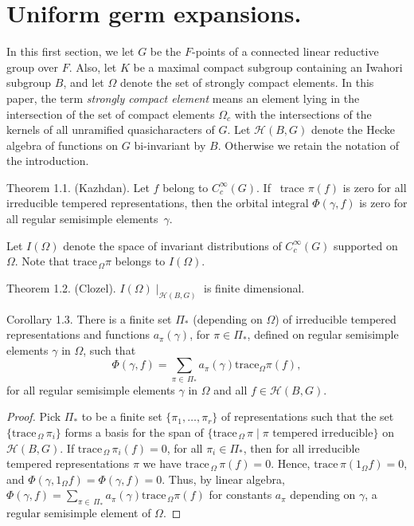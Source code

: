 \documentclass{amsart}
\begin{document}
\section{{{Uniform germ expansions.}}}


\medskip
\noindent
In this first section, we let $G$ be the $F$-points of a 
  connected linear reductive group over $F$. Also, let $K$ 
  be a maximal
  compact subgroup containing an Iwahori subgroup $B$, and
let
   $ \Omega $
denote the set of strongly compact elements.  In this paper, the term
{\it strongly compact element} means an element lying in the
intersection of the set of compact elements $\Omega_c$ with
the intersections of the kernels of all unramified quasicharacters of $G$.
Let 
  $ {\mathcal H} (B,G) $
denote the Hecke algebra of functions on $G$ bi-invariant
  by $B$.
Otherwise we retain the notation of the introduction.

\proclaim Theorem {1.1.} {\rm (Kazhdan)}.
Let
  $ f$ belong to $C_c^{\infty} (G) $.
If \, {\rm trace}
  $ \pi (f)$ is zero 
for all irreducible tempered representations, then the orbital integral
  $ \Phi (\gamma,f) $ is zero
for all regular semisimple elements~$ \gamma $.
\finishproclaim

Let
  $ I (\Omega) $
denote the space of invariant distributions of
  $ C_c^{\infty} (G) $
supported on $\Omega$.
Note that 
  $ \text{trace}_{\,\Omega} \pi $ belongs to $I(\Omega) $.

\proclaim Theorem {1.2.} {\rm (Clozel)}.
  $ I (\Omega) \mid_{{\mathcal H}(B,G)} $
is finite dimensional.
\finishproclaim

\proclaim Corollary {1.3}.
There is a finite set
  $ \Pi_* $ (depending on $\Omega$)
of irreducible tempered representations and functions
  $ a_{\pi} (\gamma) $,
for 
  $ \pi \in \Pi_* $,
defined on regular semisimple elements
  $ \gamma $ 
in
  $ \Omega $,
such that
%
$$
  \Phi (\gamma, f) 
=
   \sum_{\pi \in \, \Pi_*}
  a_{\pi} (\gamma) 
  \text{trace}_\Omega{\pi} (f),
$$
%
for all 
regular semisimple elements $\gamma$ in 
  $ \Omega $
and all 
  $ f \in {\mathcal H} (B,G) $.
\finishproclaim

\begin{proof} 
Pick $\Pi_*$ to be a finite set 
  $ \{\pi_1, \dots , \pi_r \} $
  of representations
such that the set
  $\{ \text{trace}_{\,\Omega} \, \pi_i \}$
forms a basis for the span of
  $ \{ \text{trace}_{\,\Omega} \, \pi \mid
    \pi \,\, \text{tempered irreducible} \} $
on 
  $ {\mathcal H} (B,G) $.
If
  $ \text{trace}_{\,\Omega} \, \pi_i (f) = 0 $, for all $\pi_i\in\Pi_*$,
then for all irreducible tempered representations $\pi$ we have
  $ \text{trace}_{\,\Omega} \, \pi (f) = 0 $.
Hence,
  $ \text{trace} \, \pi (1_{\Omega} f) = 0 $,
and
  $ \Phi (\gamma, 1_{\Omega} f) = 
    \Phi (\gamma, f) = 0 $.
Thus, by linear algebra,
  $ \Phi (\gamma,f) = 
    \sum_{\pi \in \,\Pi_*} 
    a_{\pi} (\gamma) \text{trace}_{\,\Omega}\pi(f) $
for constants
  $ a_{\pi} $
depending on
  $ \gamma$, a regular
  semisimple element of $\Omega$.
\end{proof}
\end{document}
